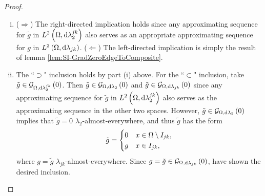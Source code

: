 \begin{proof}
	\begin{enumerate}[(i)]
		\item ($\Rightarrow$) The right-directed implication holds since any approximating sequence for $\tilde{g}$ in $L^{2}\left( \Omega,\mathrm{d} \lambda_2^{jk} \right)$ also serves as an appropriate approximating sequence for $g$ in $L^{2}\left( \Omega,\mathrm{d} \lambda_{jk} \right)$. \newline
		($\Leftarrow$) The left-directed implication is simply the result of lemma \ref{lem:SI-GradZeroEdgeToComposite}.
		\item The ``$\supset$" inclusion holds by part (i) above.
		For the ``$\subset$" inclusion, take $\tilde{g}\in\mathcal{G}_{ \Omega, \mathrm{d}\lambda_2^{jk}}\left( 0 \right)$.
		Then $\tilde{g}\in\mathcal{G}_{ \Omega, \mathrm{d}\lambda_2}\left( 0 \right)$ and $\tilde{g}\in\mathcal{G}_{ \Omega, \mathrm{d}\lambda_{jk}}\left( 0 \right)$ since any approximating sequence for $\tilde{g}$ in $L^{2}\left( \Omega,\mathrm{d} \lambda_2^{jk} \right)$ also serves as the approximating sequence in the other two spaces.
		However, $\tilde{g}\in\mathcal{G}_{ \Omega, \mathrm{d}\lambda_2}\left( 0 \right)$ implies that $\tilde{g}=0$ $\lambda_2$-almost-everywhere,	and thus $\tilde{g}$ has the form
		\begin{align*}
			\tilde{g} = \begin{cases} 0 & x\in\Omega\setminus I_{jk}, \\ g & x\in I_{jk}, \end{cases}
		\end{align*}
		where $g = \tilde{g}$ $\lambda_{jk}$-almost-everywhere.
		Since $g = \tilde{g}\in\mathcal{G}_{ \Omega, \mathrm{d}\lambda_{jk}}\left( 0 \right)$, have shown the desired inclusion.
	\end{enumerate}
\end{proof}


